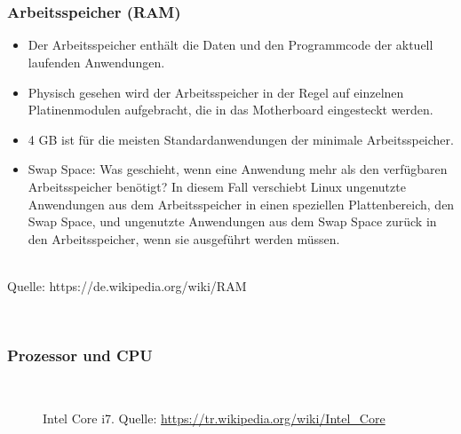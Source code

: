 ~\\~\\
\begin{minipage}[t]{0.7\textwidth}
	\subsubsection{Arbeitsspeicher (RAM)}
	\begin{itemize}
		\item Der Arbeitsspeicher enthält die Daten und den Programmcode der aktuell laufenden Anwendungen.
		\item Physisch gesehen wird der Arbeitsspeicher in der Regel auf einzelnen Platinenmodulen aufgebracht, die in das Motherboard eingesteckt werden.
		\item  4 GB ist für die meisten Standardanwendungen der minimale Arbeitsspeicher.
		\item Swap Space: Was geschieht, wenn eine Anwendung mehr als den verfügbaren Arbeitsspeicher benötigt? In diesem Fall verschiebt Linux ungenutzte Anwendungen aus dem Arbeitsspeicher in einen speziellen Plattenbereich, den Swap Space, und ungenutzte Anwendungen aus dem Swap Space zurück in den Arbeitsspeicher, wenn sie ausgeführt werden müssen.
	\end{itemize}
\end{minipage}
\begin{minipage}[t]{0.3\textwidth}
\centering
~\\
\tiny
Quelle: https://de.wikipedia.org/wiki/RAM
\end{minipage}
%
%
~\\
\subsubsection{Prozessor und CPU}
\begin{figure}[h!]
	\centering
	~\\
\caption[Intel Core i7]{	Intel Core i7. 
	Quelle: \url{https://tr.wikipedia.org/wiki/Intel_Core}}
\end{figure}

